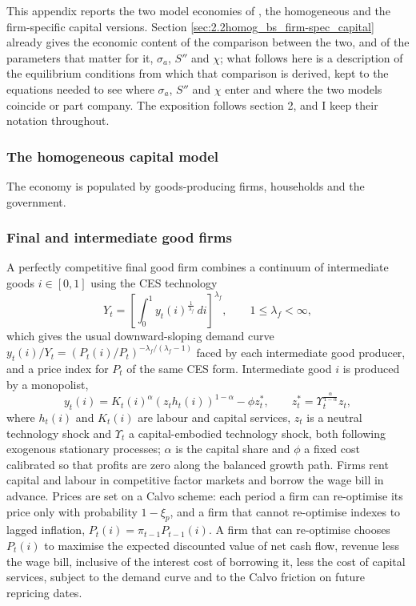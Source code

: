 \documentclass[12pt, a4paper]{article}
\begin{document}
\begin{appendices}
This appendix reports the two model economies of \citet{ACEL2011}, the homogeneous and the
firm-specific capital versions. Section \ref{sec:2.2homog_bs_firm-spec_capital} already gives
the economic content of the comparison between the two, and of the parameters that matter for
it, $\sigma_a$, $S''$ and $\chi$; what follows here is a description of the equilibrium
conditions from which that comparison is derived, kept to the equations needed to see where
$\sigma_a$, $S''$ and $\chi$ enter and where the two models coincide or part company. The
exposition follows \citet{ACEL2011} section 2, and I keep their notation throughout.

\subsubsection*{The homogeneous capital model}

The economy is populated by goods-producing firms, households and the government.

\subsubsection*{Final and intermediate good firms}

A perfectly competitive final good firm combines a continuum of intermediate goods
$i \in [0,1]$ using the CES technology
\begin{equation}
    Y_t = \left[\int_0^1 y_t(i)^{\frac{1}{\lambda_f}} \, di \right]^{\lambda_f}, \qquad 1 \le \lambda_f < \infty,
    \label{eq:app_Yt}
\end{equation}
which gives the usual downward-sloping demand curve $y_t(i)/Y_t = (P_t(i)/P_t)^{-\lambda_f/(\lambda_f-1)}$
faced by each intermediate good producer, and a price index for $P_t$ of the same CES form.
Intermediate good $i$ is produced by a monopolist,
\begin{equation}
    y_t(i) = K_t(i)^{\alpha}(z_t h_t(i))^{1-\alpha} - \phi z_t^{*}, \qquad z_t^{*} = \Upsilon_t^{\frac{\alpha}{1-\alpha}} z_t,
    \label{eq:app_prod}
\end{equation}
where $h_t(i)$ and $K_t(i)$ are labour and capital services, $z_t$ is a neutral technology
shock and $\Upsilon_t$ a capital-embodied technology shock, both following exogenous stationary
processes; $\alpha$ is the capital share and $\phi$ a fixed cost calibrated so that profits are
zero along the balanced growth path. Firms rent capital and labour in competitive factor
markets and borrow the wage bill in advance. Prices are set on a Calvo scheme: each
period a firm can re-optimise its price only with probability $1-\xi_p$, and a firm that cannot
re-optimise indexes to lagged inflation, $P_t(i) = \pi_{t-1}P_{t-1}(i)$. A firm that can
re-optimise chooses $P_t(i)$ to maximise the expected discounted value of net cash flow, revenue
less the wage bill, inclusive of the interest cost of borrowing it, less the cost of capital
services, subject to the demand curve and to the Calvo friction on future repricing dates.


\end{appendices}
\end{document}
